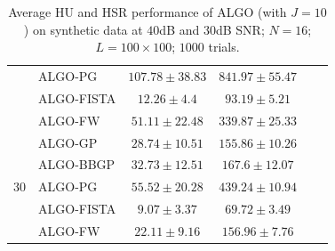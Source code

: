 \begin{table}[h]
\begin{adjustbox}{max width=\textwidth}
\begin{tabular}{|c|l|c|c|c|c|}
                    & ALGO-PG                    & $107.78   \pm 38.83$  & $841.97   \pm 55.47$ \tabularnewline
                    & ALGO-FISTA                 & $12.26    \pm 4.4$    & $93.19    \pm 5.21$  \tabularnewline
                    & ALGO-FW                    & $51.11    \pm 22.48$  & $339.87   \pm 25.33$ \tabularnewline \cline{1-4}
\multirow{5}{*}{30} & ALGO-GP                    & $28.74    \pm 10.51$  & $155.86   \pm 10.26$ \tabularnewline
                    & ALGO-BBGP                  & $32.73    \pm 12.51$  & $167.6    \pm 12.07$ \tabularnewline
                    & ALGO-PG                    & $55.52    \pm 20.28$  & $439.24   \pm 10.94$ \tabularnewline
                    & ALGO-FISTA                 & $9.07     \pm 3.37$   & $69.72    \pm 3.49$  \tabularnewline
                    & ALGO-FW                    & $22.11    \pm 9.16$   & $156.96   \pm 7.76$  \tabularnewline \cline{1-4}
\end{tabular}
\end{adjustbox}
\caption{Average HU and HSR performance of ALGO (with $J=10$) on synthetic
         data at $40$dB and $30$dB SNR; $N = 16$; $L = 100 \times 100$; $1000$
         trials.}
\label{table:results_full_MO16_SNR4030dB_J10}
\end{table}

\newpage

